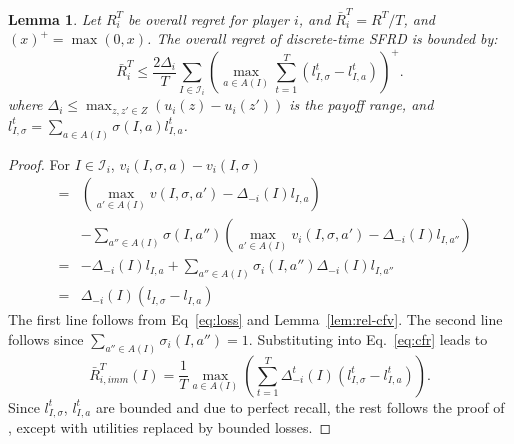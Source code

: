 \documentclass{aamas2014}
\newcommand{\cI}{\mathcal{I}}
\newtheorem{lemma}{Lemma}
\begin{document}
\begin{lemma}
\label{lem:cfr}
Let $R^T_i$ be overall regret for player $i$, and $\bar{R}^T_i = R^T / T$, and $(x)^+ = \max(0,x)$. The overall regret of  
discrete-time SFRD is bounded by: 
\[
\bar{R}^T_i \le \frac{2 \Delta_i}{T} \sum_{ I \in \cI_i} \left( \max_{a \in A(I)} \sum_{t=1}^T ( l^t_{I,\sigma} - l^t_{I,a}) \right)^+. 
\]
where $\Delta_i \le \max_{z,z' \in Z} ( u_i(z) - u_i(z') )$ is the payoff range, 
and $l^t_{I,\sigma} = \sum_{a \in A(I)} \sigma(I,a) l^t_{I,a}$.
\end{lemma}
\begin{proof}
For $I \in \cI_i$, $v_i(I,\sigma,a) - v_i(I,\sigma)$
\begin{eqnarray*}
 & = &   (\max_{a' \in A(I)} v(I,\sigma,a') - \Delta_{-i}(I) l_{I,a})\\
 &   & - \sum_{a'' \in A(I)} \sigma(I,a'') \left( \max_{a' \in A(I)} v_i(I,\sigma,a') - \Delta_{-i}(I) l_{I,a''} \right) \\ 
 & = & - \Delta_{-i}(I) l_{I,a} + \sum_{a'' \in A(I)} \sigma_i(I,a'') \Delta_{-i}(I) l_{I,a''}\\
 & = & \Delta_{-i}(I) ( l_{I,\sigma} - l_{I,a} ) 
\end{eqnarray*}
The first line follows from Eq~\ref{eq:loss} and Lemma~\ref{lem:rel-cfv}.
The second line follows since $\sum_{a'' \in A(I)} \sigma_i(I,a'') = 1$. Substituting into Eq.~\ref{eq:cfr} leads to
\begin{equation}
\label{eq:pw-immreg}
\bar{R}^T_{i,imm}(I)  =  \frac{1}{T} \max_{a \in A(I)} \left( \sum_{t=1}^T \Delta^t_{-i}(I) (l^t_{I,\sigma} - l^t_{I,a}) \right). 
\end{equation}
Since $l^t_{I,\sigma}$, $l^t_{I,a}$ are bounded and due to perfect recall, the rest follows  
the proof of \cite[Theorem 3]{CFR}, except with utilities replaced by bounded losses. 
\end{proof}
\end{document}
